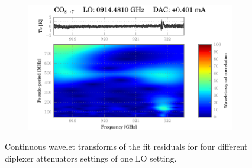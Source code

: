 \begin{figure}
\begin{subfigure}[b]{0.5\textwidth}
    \end{subfigure}%
    \hfill
    \begin{subfigure}[b]{0.5\textwidth}
        \includegraphics[width=\textwidth]{50015e1d_WBS-H-USB_04-18_fit_wavelet}
    \end{subfigure}%
    \caption{
        Continuous wavelet transforms of the  fit residuals for four different diplexer attenuators settings of one LO setting.
    }
    \label{fig:wavelet_co87}
\end{figure}
